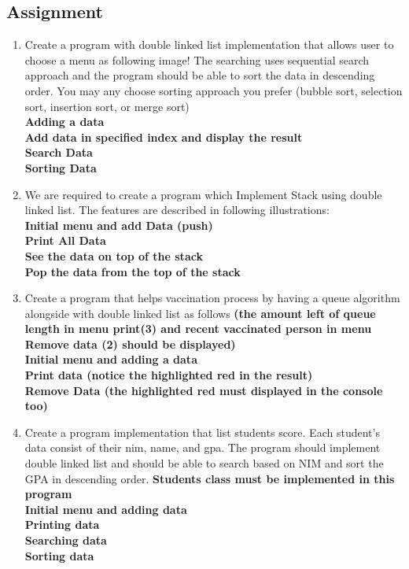 \documentclass[12pt,titlepage]{article}
\begin{document}
\subsection{Assignment}
\begin{enumerate} 
    \item Create a program with double linked list implementation that allows user to choose a menu as following image! The searching uses sequential search approach and the program should be able to sort the data in descending order. You may any choose sorting approach you prefer (bubble sort, selection sort, insertion sort, or merge sort)
    \hbox{}\\\textbf{Adding a data}
    \hbox{}\\\textbf{Add data in specified index and display the result}
    \hbox{}\\\textbf{Search Data}
    \hbox{}\\\textbf{Sorting Data}
    \item We are required to create a program which Implement Stack using double linked list. The features are described in following illustrations:
    \hbox{}\\\textbf{Initial menu and add Data (push)}
    \hbox{}\\\textbf{Print All Data}
    \hbox{}\\\textbf{See the data on top of the stack}
    \hbox{}\\\textbf{Pop the data from the top of the stack}
    \item Create a program that helps vaccination process by having a queue algorithm alongside with double linked list as follows \textbf{(the amount left of queue length in menu print(3) and recent vaccinated person in menu Remove data (2) should be displayed)}
    \hbox{}\\\textbf{Initial menu and adding a data}
    \hbox{}\\\textbf{Print data (notice the highlighted red in the result)}
    \hbox{}\\\textbf{Remove Data (the highlighted red must displayed in the console too)}
    \item Create a program implementation that list students score. Each student’s data consist of their nim, name, and gpa. The program should implement double linked list and should be able to search based on NIM and sort the GPA in descending order. \textbf{Students class must be implemented in this program}
    \hbox{}\\\textbf{Initial menu and adding data}
    \hbox{}\\\textbf{Printing data}
    \hbox{}\\\textbf{Searching data}
    \hbox{}\\\textbf{Sorting data}
\end{enumerate}
\end{document}
